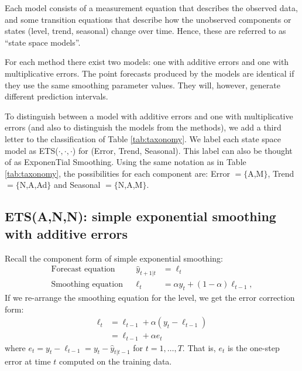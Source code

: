 \documentclass[]{book}
\begin{document}
Each model consists of a measurement equation that describes the observed data, and some transition equations that describe how the unobserved components or states (level, trend, seasonal) change over time. Hence, these are referred to as ``state space models''.

For each method there exist two models: one with additive errors and one with multiplicative errors. The point forecasts produced by the models are identical if they use the same smoothing parameter values. They will, however, generate different prediction intervals.

To distinguish between a model with additive errors and one with multiplicative errors (and also to distinguish the models from the methods), we add a third letter to the classification of Table \ref{tab:taxonomy}. We label each state space model as ETS(\(\cdot,\cdot,\cdot\)) for (Error, Trend, Seasonal). This label can also be thought of as ExponenTial Smoothing. Using the same notation as in Table \ref{tab:taxonomy}, the possibilities for each component are: Error \(=\{\)A,M\(\}\), Trend \(=\{\)N,A,Ad\(\}\) and Seasonal \(=\{\)N,A,M\(\}\).

\hypertarget{etsann-simple-exponential-smoothing-with-additive-errors}{%
\subsection*{ETS(A,N,N): simple exponential smoothing with additive errors}\label{etsann-simple-exponential-smoothing-with-additive-errors}}

Recall the component form of simple exponential smoothing:
\begin{align*}
  \text{Forecast equation}  && \hat{y}_{t+1|t} & = \ell_{t}\\
  \text{Smoothing equation} && \ell_{t}        & = \alpha y_{t} + (1 - \alpha)\ell_{t-1},
\end{align*}
If we re-arrange the smoothing equation for the level, we get the error correction form:
\begin{align*}
\ell_{t} %
         &= \ell_{t-1}+\alpha( y_{t}-\ell_{t-1})\\
         &= \ell_{t-1}+\alpha e_{t}
\end{align*}
where \(e_{t}=y_{t}-\ell_{t-1}=y_{t}-\hat{y}_{t|t-1}\) for \(t=1,\dots,T\). That is, \(e_{t}\) is the one-step error at time \(t\) computed on the training data.
\end{document}
